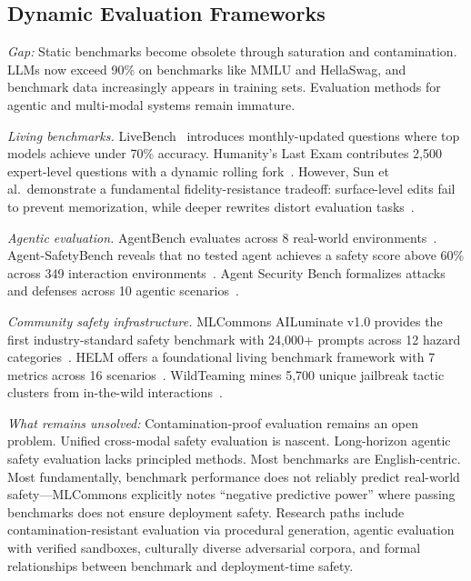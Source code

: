 \subsection{Dynamic Evaluation Frameworks}
\label{sec:future-eval}

\emph{Gap:} Static benchmarks become obsolete through saturation and contamination. LLMs now exceed 90\% on benchmarks like MMLU and HellaSwag, and benchmark data increasingly appears in training sets. Evaluation methods for agentic and multi-modal systems remain immature.

\emph{Living benchmarks.} LiveBench~\cite{white2024livebench} introduces monthly-updated questions where top models achieve under 70\% accuracy. Humanity's Last Exam contributes 2,500 expert-level questions with a dynamic rolling fork~\cite{phan2025humanitylastexam}. However, Sun et al.\ demonstrate a fundamental fidelity-resistance tradeoff: surface-level edits fail to prevent memorization, while deeper rewrites distort evaluation tasks~\cite{sun2025contamination}.

\emph{Agentic evaluation.} AgentBench evaluates across 8 real-world environments~\cite{liu2024agentbench}. Agent-SafetyBench reveals that no tested agent achieves a safety score above 60\% across 349 interaction environments~\cite{zhang2024agentsafetybench}. Agent Security Bench formalizes attacks and defenses across 10 agentic scenarios~\cite{asb2025}.

\emph{Community safety infrastructure.} MLCommons AILuminate v1.0 provides the first industry-standard safety benchmark with 24,000+ prompts across 12 hazard categories~\cite{ghosh2024ailuminate}. HELM offers a foundational living benchmark framework with 7 metrics across 16 scenarios~\cite{liang2023helm}. WildTeaming mines 5,700 unique jailbreak tactic clusters from in-the-wild interactions~\cite{jiang2024wildteaming}.

\emph{What remains unsolved:} Contamination-proof evaluation remains an open problem. Unified cross-modal safety evaluation is nascent. Long-horizon agentic safety evaluation lacks principled methods. Most benchmarks are English-centric. Most fundamentally, benchmark performance does not reliably predict real-world safety---MLCommons explicitly notes ``negative predictive power'' where passing benchmarks does not ensure deployment safety. Research paths include contamination-resistant evaluation via procedural generation, agentic evaluation with verified sandboxes, culturally diverse adversarial corpora, and formal relationships between benchmark and deployment-time safety.
